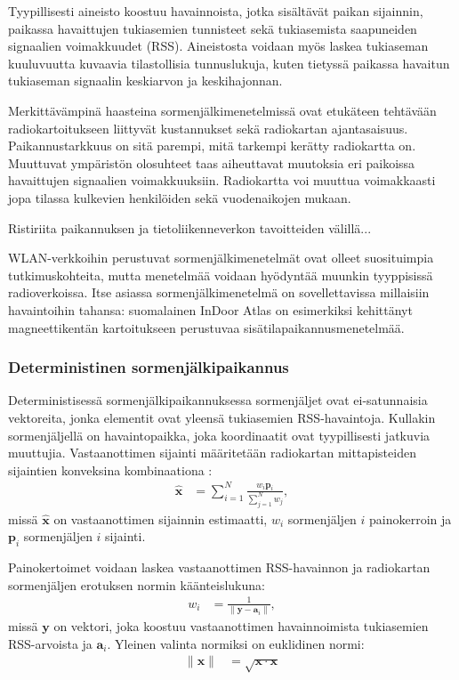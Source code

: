 Tyypillisesti aineisto koostuu havainnoista, jotka sisältävät paikan sijainnin,
paikassa havaittujen tukiasemien tunnisteet sekä tukiasemista saapuneiden
signaalien voimakkuudet (RSS). Aineistosta voidaan myös laskea tukiaseman
kuuluvuutta kuvaavia tilastollisia tunnuslukuja, kuten tietyssä paikassa
havaitun tukiaseman signaalin keskiarvon ja keskihajonnan.

Merkittävämpinä haasteina sormenjälkimenetelmissä ovat etukäteen tehtävään
radiokartoitukseen liittyvät kustannukset sekä radiokartan ajantasaisuus.
Paikannustarkkuus on sitä parempi, mitä tarkempi kerätty radiokartta on.
Muuttuvat ympäristön olosuhteet taas aiheuttavat muutoksia
eri paikoissa havaittujen signaalien voimakkuuksiin. Radiokartta voi
muuttua voimakkaasti jopa tilassa kulkevien henkilöiden sekä vuodenaikojen
mukaan.

Ristiriita paikannuksen ja tietoliikenneverkon tavoitteiden välillä...

WLAN-verkkoihin perustuvat sormenjälkimenetelmät ovat olleet suosituimpia
tutkimuskohteita, mutta menetelmää voidaan hyödyntää muunkin tyyppisissä
radioverkoissa. Itse asiassa sormenjälkimenetelmä on sovellettavissa
millaisiin havaintoihin tahansa: suomalainen InDoor Atlas on
esimerkiksi kehittänyt magneettikentän kartoitukseen perustuvaa
sisätilapaikannusmenetelmää.

\subsubsection{Deterministinen sormenjälkipaikannus}

Deterministisessä sormenjälkipaikannuksessa sormenjäljet ovat
ei-satunnaisia vektoreita, jonka elementit ovat yleensä
tukiasemien RSS-havaintoja. Kullakin sormenjäljellä on havaintopaikka,
joka koordinaatit ovat tyypillisesti jatkuvia muuttujia.
Vastaanottimen sijainti määritetään
radiokartan mittapisteiden sijaintien konveksina kombinaationa 
\cite{honkavirta2009}:
\begin{align}
  \mathbf{\hat{x}} &= \sum_{i=1}^N \frac{w_i \mathbf{p}_i}{\sum_{j=1}^N w_j},
\end{align}
missä $\mathbf{\hat{x}}$ on vastaanottimen sijainnin estimaatti,
$w_i$ sormenjäljen $i$ painokerroin ja $\mathbf{p}_i$ sormenjäljen $i$
sijainti.

Painokertoimet voidaan laskea vastaanottimen RSS-havainnon
ja radiokartan sormenjäljen erotuksen normin käänteislukuna:
\begin{align}
  w_i &= \frac{1}{\| \mathbf{y} - \mathbf{a}_i \|},
\end{align}
missä $\mathbf{y}$ on vektori, joka koostuu vastaanottimen havainnoimista
tukiasemien RSS-arvoista ja $\mathbf{a}_i$. Yleinen valinta normiksi on
euklidinen normi:
\begin{align}
  \| \mathbf{x} \| &= \sqrt{\mathbf{x} \cdot \mathbf{x}}
\end{align}


